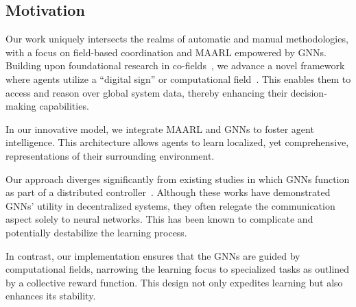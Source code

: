 \subsection{Motivation}
Our work uniquely intersects the realms of automatic and manual methodologies, with a focus on field-based coordination and \ac{MAARL} empowered by \acp{GNN}.
%
Building upon foundational research in co-fields~\cite{DBLP:journals/pervasive/MameiZL04}, 
 we advance a novel framework where agents utilize a ``digital sign'' or computational field~\cite{DBLP:journals/ijaci/CastelfranchiPT10}. 
 This enables them to access and reason over global system data, 
 thereby enhancing their decision-making capabilities.

In our innovative model, 
 we integrate \ac{MAARL} and GNNs to foster agent intelligence. 
 This architecture allows agents to learn localized, yet comprehensive, representations of their surrounding environment.

Our approach diverges significantly from existing studies in which GNNs function as part of a distributed controller~\cite{DBLP:conf/icra/GosrichMLPYR022,DBLP:conf/corl/TolstayaGPP0R19}. 
 Although these works have demonstrated GNNs' utility in decentralized systems, they often relegate the communication aspect solely to neural networks. 
 This has been known to complicate and potentially destabilize the learning process.

In contrast, 
 our implementation ensures that the GNNs are guided by computational fields, narrowing the learning focus to specialized tasks as outlined by a collective reward function. 
 This design not only expedites learning but also enhances its stability.
